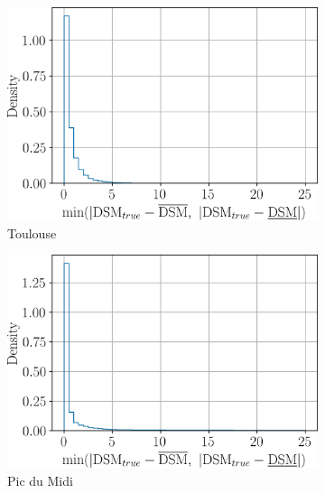 \begin{figure}
    \centering
    \begin{subfigure}[t]{0.49\linewidth}
        \flushleft
        \includegraphics[width=\linewidth]{Images/Chap_6/histogram_elevation_eps_Toulouse.png}
        \caption{Toulouse}
        \label{fig:error_hist}
    \end{subfigure}\hfill
    \begin{subfigure}[t]{0.49\linewidth}
        \flushright
        \includegraphics[width=\linewidth]{Images/Chap_6/histogram_elevation_eps_Pic_du_midi.png}
        \caption{Pic du Midi}
        \label{fig:error_hist_pic_du_midi}
    \end{subfigure}\vspace*{0.3cm}\\
    \centering
    \begin{subfigure}[t]{0.49\linewidth}

\end{subfigure}
\end{figure}
